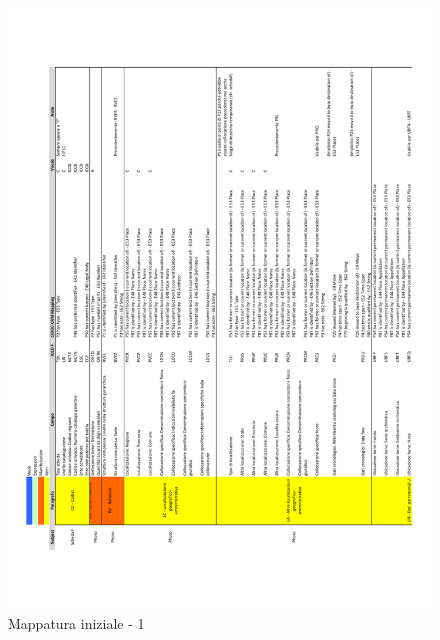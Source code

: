 \begin{center}
\begin{figure}[ht!]
    \centering
    \includegraphics{images/Mapping-v3-1.pdf}
	\caption{Mappatura iniziale - 1}
	\label{fig:mapping-v3-1}
\end{figure}
\begin{figure}[ht!]
    \centering

\end{figure}
\end{center}
